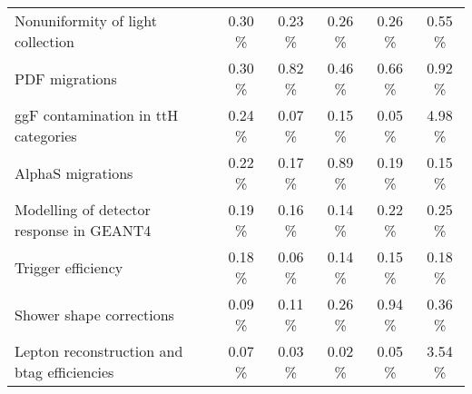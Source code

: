 {\begin{tabular} { |l |  c |  c |  c |  c |  c |  }
   Nonuniformity of light collection  &  0.30 \% &  0.23 \% &  0.26 \% &  0.26 \% &  0.55 \% \\
   PDF migrations  &  0.30 \% &  0.82 \% &  0.46 \% &  0.66 \% &  0.92 \% \\
   ggF contamination in ttH categories  &  0.24 \% &  0.07 \% &  0.15 \% &  0.05 \% &  4.98 \% \\
   AlphaS migrations  &  0.22 \% &  0.17 \% &  0.89 \% &  0.19 \% &  0.15 \% \\
   Modelling of detector response in GEANT4  &  0.19 \% &  0.16 \% &  0.14 \% &  0.22 \% &  0.25 \% \\
   Trigger efficiency  &  0.18 \% &  0.06 \% &  0.14 \% &  0.15 \% &  0.18 \% \\
   Shower shape corrections  &  0.09 \% &  0.11 \% &  0.26 \% &  0.94 \% &  0.36 \% \\
   Lepton reconstruction and btag efficiencies  &  0.07 \% &  0.03 \% &  0.02 \% &  0.05 \% &  3.54 \% \\
   \hline
   \end{tabular}}
